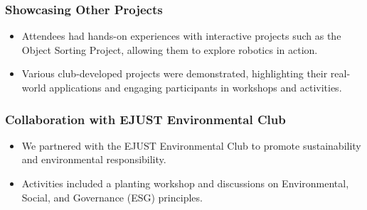 \documentclass[a4paper,12pt]{article}
\begin{document}
\subsubsection{Showcasing Other Projects}
\begin{itemize}
    \item Attendees had hands-on experiences with interactive projects such as the Object Sorting Project, allowing them to explore robotics in action.
    \item Various club-developed projects were demonstrated, highlighting their real-world applications and engaging participants in workshops and activities.
\end{itemize}

\subsubsection{Collaboration with EJUST Environmental Club}
\begin{itemize}
    \item We partnered with the EJUST Environmental Club to promote sustainability and environmental responsibility.
    \item Activities included a planting workshop and discussions on Environmental, Social, and Governance (ESG) principles.
\end{itemize}
\end{document}
